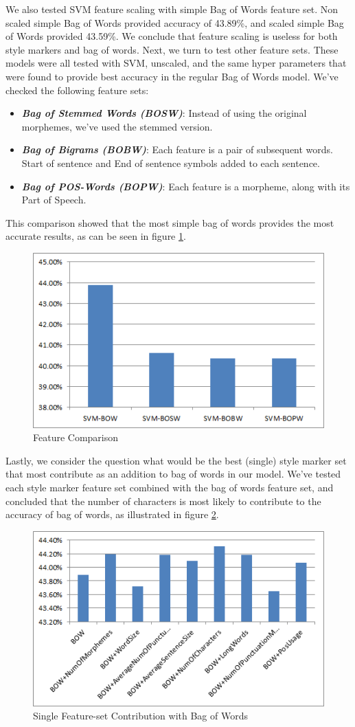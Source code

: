 \documentclass[a4paper]{article}
\begin{document}
We also tested SVM feature scaling with simple Bag of Words feature set.
Non scaled simple Bag of Words provided accuracy of 43.89\%, and scaled simple Bag of Words provided 43.59\%.
We conclude that feature scaling is useless for both style markers and bag of words.
Next, we turn to test other feature sets. These models were all tested with SVM, unscaled, and the same hyper parameters that were found to provide best accuracy in the regular Bag of Words model. We've checked the following feature sets:
\begin{itemize}
\item \textbf{\emph{Bag of Stemmed Words (BOSW)}}: Instead of using the original morphemes, we've used the stemmed version.
\item \textbf{\emph{Bag of Bigrams (BOBW)}}: Each feature is a pair of subsequent words. Start of sentence and End of sentence symbols added to each sentence.
\item \textbf{\emph{Bag of POS-Words (BOPW)}}: Each feature is a morpheme, along with its Part of Speech.
\end{itemize}
This comparison showed that the most simple bag of words provides the most accurate results, as can be seen in figure \ref{fig:feature comparison}.
\begin{figure}[!h]
	\centering
	\includegraphics[width=.5\textwidth]{"figures/feature_comparison"}
	\caption{Feature Comparison}
	\label{fig:feature comparison}
\end{figure}
Lastly, we consider the question what would be the best (single) style marker set that most contribute as an addition to bag of words in our model.
We've tested each style marker feature set combined with the bag of words feature set, and concluded that the number of characters is most likely to contribute to the accuracy of bag of words, as illustrated in figure \ref{fig:contribute}.
\begin{figure}[!h]
	\centering
	\includegraphics[width=.5\textwidth]{"figures/contribute"}
	\caption{Single Feature-set Contribution with Bag of Words}
	\label{fig:contribute}
\end{figure}
\end{document}
